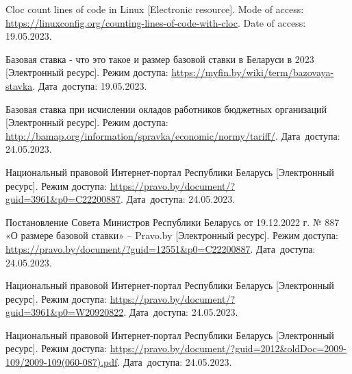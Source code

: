 \begin{thebibliography}{}
    Cloc count lines of code in Linux
    [Electronic resource].
    Mode of access: \url{https://linuxconfig.org/counting-lines-of-code-with-cloc}.
    Date of access: 19.05.2023.

    Базовая ставка - что это такое и размер базовой ставки в Беларуси в 2023
    [Электронный ресурс].
    Режим доступа: \url{https://myfin.by/wiki/term/bazovaya-stavka}.
    Дата~доступа: 19.05.2023.

    Базовая ставка при исчислении окладов работников бюджетных организаций
    [Электронный ресурс].
    Режим доступа: \url{http://bamap.org/information/spravka/economic/normy/tariff/}.
    Дата~доступа: 24.05.2023.

    Национальный правовой Интернет-портал Республики Беларусь
    [Электронный ресурс].
    Режим доступа: \url{https://pravo.by/document/?guid=3961&p0=C22200887}.
    Дата~доступа: 24.05.2023.

    Постановление Совета Министров Республики Беларусь от 19.12.2022 г. № 887 «О размере базовой ставки» – Pravo.by
    [Электронный ресурс].
    Режим доступа: \url{https://pravo.by/document/?guid=12551&p0=C22200887}.
    Дата~доступа: 24.05.2023.

    Национальный правовой Интернет-портал Республики Беларусь
    [Электронный ресурс].
    Режим доступа: \url{https://pravo.by/document/?guid=3961&p0=W20920822}.
    Дата~доступа: 24.05.2023.

    Национальный правовой Интернет-портал Республики Беларусь
    [Электронный ресурс].
    Режим доступа: \url{https://pravo.by/document/?guid=2012&oldDoc=2009-109/2009-109(060-087).pdf}.
    Дата~доступа: 24.05.2023.



\end{thebibliography}
